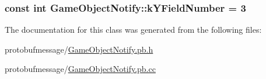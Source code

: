 \hypertarget{class_game_object_notify_a4750c0b42b3b9515597e0d6665245f56}{
\subsubsection[{k\-Y\-Field\-Number}]{\setlength{\rightskip}{0pt plus 5cm}const int Game\-Object\-Notify\-::k\-Y\-Field\-Number = 3\hspace{0.3cm}{\ttfamily [static]}}}\label{class_game_object_notify_a4750c0b42b3b9515597e0d6665245f56}


The documentation for this class was generated from the following files\-:\begin{DoxyCompactItemize}
\item 
protobufmessage/\hyperlink{_game_object_notify_8pb_8h}{Game\-Object\-Notify.\-pb.\-h}\item 
protobufmessage/\hyperlink{_game_object_notify_8pb_8cc}{Game\-Object\-Notify.\-pb.\-cc}\end{DoxyCompactItemize}
